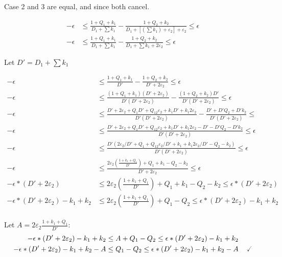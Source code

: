 \documentclass[11pt]{amsart}
\begin{document}
Case 2 and 3 are equal, and since both cancel.


\begin{align*}
-\epsilon &\leq \frac{1 + Q_1 + k_1}{D_1 +  \sum k_1} - \frac{1 + Q_2 + k_2}{D_1 + \left[ \left(\sum k_1\right) + \varepsilon_2\right] + \varepsilon_2}  \leq \epsilon \\
-\epsilon &\leq \frac{1 + Q_1 + k_1}{D_1 +  \sum k_1} - \frac{1 + Q_2 + k_2}{D_1 + \sum k_1 + 2\varepsilon_2}  \leq \epsilon
\end{align*}

Let $D' = D_1 + \sum k_1$

\begin{align*}
-\epsilon &\leq \frac{1 + Q_1 + k_1}{D'} - \frac{1 + Q_2 + k_2}{D' + 2\varepsilon_2}  \leq \epsilon \\
-\epsilon &\leq \frac{(1 + Q_1 + k_1)(D' + 2\varepsilon_2)}{D'(D' + 2\varepsilon_2)} - \frac{(1 + Q_2 + k_2)D'}{D'(D' + 2\varepsilon_2)}  \leq \epsilon \\
-\epsilon &\leq \frac{D' + 2\varepsilon_2 + Q_1D' + Q_12\varepsilon_2 + k_1D' + k_1 2\varepsilon_2}{D'(D' + 2\varepsilon_2)} - \frac{D' + D'Q_2 + D'k_2}{D'(D' + 2\varepsilon_2)}  \leq \\
-\epsilon &\leq \frac{D' + 2\varepsilon_2 + Q_1D' + Q_12\varepsilon_2 + k_1D' + k_1 2\varepsilon_2 - D' - D'Q_2 - D'k_2}{D'(D' + 2\varepsilon_2)}  \leq \epsilon \\
-\epsilon &\leq \frac{D'(2\varepsilon_2 / D' + Q_1 + Q_12\varepsilon_2/D' + k_1 + k_1 2\varepsilon_2 / D'  - Q_2 - k_2)}{D'(D' + 2\varepsilon_2)}  \leq \epsilon \\
-\epsilon &\leq \frac{2\varepsilon_2 (\frac{1 + k_1 + Q_1}{D'}) + Q_1 + k_1 - Q_2 - k_2}{D' + 2\varepsilon_2}  \leq \epsilon \\
-\epsilon*(D' + 2\varepsilon_2) &\leq 2\varepsilon_2 \left(\frac{1 + k_1 + Q_1}{D'}\right) + Q_1 + k_1 - Q_2 - k_2 \leq \epsilon*(D' + 2\varepsilon_2) \\
-\epsilon*(D' + 2\varepsilon_2) - k_1 + k_2 &\leq 2\varepsilon_2 \left(\frac{1 + k_1 + Q_1}{D'}\right) + Q_1 - Q_2 \leq \epsilon*(D' + 2\varepsilon_2) - k_1 + k_2 \\
\end{align*}

Let $A = 2\varepsilon_2 \frac{1 + k_1 + Q_1}{D'}$:
\begin{align*}
-\epsilon*(D' + 2\varepsilon_2) - k_1 + k_2 &\leq A + Q_1 - Q_2 \leq \epsilon*(D' + 2\varepsilon_2) - k_1 + k_2 \\
-\epsilon*(D' + 2\varepsilon_2) - k_1 + k_2 - A &\leq Q_1 - Q_2 \leq \epsilon*(D' + 2\varepsilon_2) - k_1 + k_2 - A \hspace{4mm}\checked
\end{align*}
\vspace{4mm}
\end{document}
